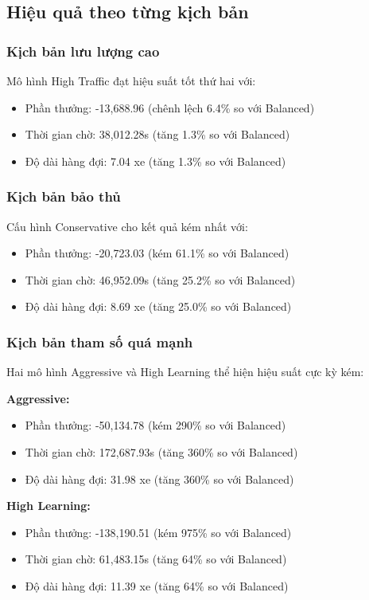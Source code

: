 \subsection{Hiệu quả theo từng kịch bản}

\subsubsection{Kịch bản lưu lượng cao}
Mô hình High Traffic đạt hiệu suất tốt thứ hai với:
\begin{itemize}
    \item Phần thưởng: -13,688.96 (chênh lệch 6.4\% so với Balanced)
    \item Thời gian chờ: 38,012.28s (tăng 1.3\% so với Balanced)
    \item Độ dài hàng đợi: 7.04 xe (tăng 1.3\% so với Balanced)
\end{itemize}

\subsubsection{Kịch bản bảo thủ}
Cấu hình Conservative cho kết quả kém nhất với:
\begin{itemize}
    \item Phần thưởng: -20,723.03 (kém 61.1\% so với Balanced)
    \item Thời gian chờ: 46,952.09s (tăng 25.2\% so với Balanced)
    \item Độ dài hàng đợi: 8.69 xe (tăng 25.0\% so với Balanced)
\end{itemize}

\subsubsection{Kịch bản tham số quá mạnh}
Hai mô hình Aggressive và High Learning thể hiện hiệu suất cực kỳ kém:

\textbf{Aggressive:}
\begin{itemize}
    \item Phần thưởng: -50,134.78 (kém 290\% so với Balanced)
    \item Thời gian chờ: 172,687.93s (tăng 360\% so với Balanced)
    \item Độ dài hàng đợi: 31.98 xe (tăng 360\% so với Balanced)
\end{itemize}

\textbf{High Learning:}
\begin{itemize}
    \item Phần thưởng: -138,190.51 (kém 975\% so với Balanced)
    \item Thời gian chờ: 61,483.15s (tăng 64\% so với Balanced)
    \item Độ dài hàng đợi: 11.39 xe (tăng 64\% so với Balanced)
\end{itemize}

